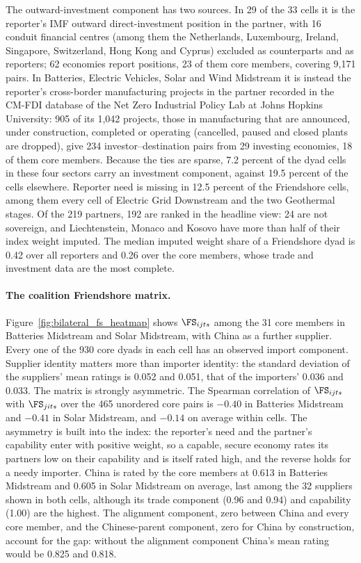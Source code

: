 The outward-investment component has two sources. In 29 of the 33 cells it is the reporter's IMF
outward direct-investment position in the partner, with 16 conduit financial centres (among them
the Netherlands, Luxembourg, Ireland, Singapore, Switzerland, Hong Kong and Cyprus) excluded as
counterparts and as reporters; 62 economies report positions, 23 of them core members, covering
9,171 pairs. In Batteries, Electric Vehicles, Solar and Wind Midstream it is instead the
reporter's cross-border manufacturing projects in the partner recorded in the CM-FDI database of
the Net Zero Industrial Policy Lab at Johns Hopkins University: 905 of its 1,042 projects, those
in manufacturing that are announced, under construction, completed or operating (cancelled, paused
and closed plants are dropped), give 234 investor--destination
pairs from 29 investing economies, 18 of them core members. Because the ties are sparse, 7.2 percent
of the dyad cells in these four sectors carry an investment component, against 19.5 percent of the
cells elsewhere. Reporter need is missing in 12.5 percent of the Friendshore cells, among them every cell of
Electric Grid Downstream and the two Geothermal stages. Of the 219 partners, 192 are ranked in the
headline view: 24 are not sovereign, and Liechtenstein, Monaco and Kosovo have more than half of
their index weight imputed. The median imputed weight share of a Friendshore dyad is 0.42 over all
reporters and 0.26 over the core members, whose trade and investment data are the most complete.

\paragraph{The coalition Friendshore matrix.} Figure~\ref{fig:bilateral_fs_heatmap} shows
$\FS_{ijts}$ among the 31 core members in Batteries Midstream and Solar Midstream, with China as a
further supplier. Every one of the 930 core dyads in each cell has an observed import component.
Supplier identity matters more than importer identity: the standard deviation of the suppliers'
mean ratings is 0.052 and 0.051, that of the importers' 0.036 and 0.033. The matrix is strongly
asymmetric. The Spearman correlation of $\FS_{ijts}$ with $\FS_{jits}$ over the 465 unordered core
pairs is $-0.40$ in Batteries Midstream and $-0.41$ in Solar Midstream, and $-0.14$ on average
within cells. The asymmetry is built into the index: the reporter's need and the partner's
capability enter with positive weight, so a capable, secure economy rates its partners low on
their capability and is itself rated high, and the reverse holds for a needy importer. China is
rated by the core members at 0.613 in Batteries Midstream and 0.605 in Solar Midstream on average,
last among the 32 suppliers shown in both cells, although its trade component (0.96 and 0.94) and
capability (1.00) are the highest. The alignment component, zero between China and every core member, and the
Chinese-parent component, zero for China by construction, account for the gap: without the alignment component China's mean rating would be 0.825 and 0.818.

